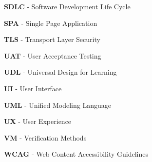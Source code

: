 \begin{description}
    \item \textbf{SDLC} - Software Development Life Cycle
    \item \textbf{SPA} - Single Page Application
    \item \textbf{TLS} - Transport Layer Security
    \item \textbf{UAT} - User Acceptance Testing
    \item \textbf{UDL} - Universal Design for Learning
    \item \textbf{UI} - User Interface
    \item \textbf{UML} - Unified Modeling Language
    \item \textbf{UX} - User Experience
    \item \textbf{VM} - Verification Methods 
    \item \textbf{WCAG} - Web Content Accessibility Guidelines
\end{description}
